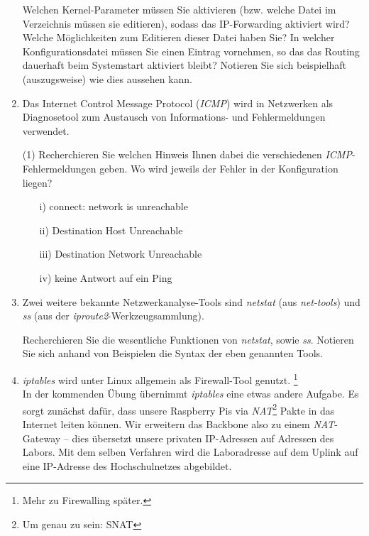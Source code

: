 \documentclass[paper=a4,fontsize=11pt]{scrartcl}%
\numberwithin{equation}{section}
\begin{document}
\begin{enumerate}
\begin{tasks}
	\task Welchen Kernel-Parameter müssen Sie aktivieren (bzw. welche Datei im  Verzeichnis müssen sie editieren), sodass das IP-Forwarding aktiviert wird? Welche Möglichkeiten zum Editieren dieser Datei haben Sie?
	\task In welcher Konfigurationsdatei müssen Sie einen Eintrag vornehmen, so das das Routing dauerhaft beim Systemstart aktiviert bleibt? Notieren Sie sich beispielhaft (auszugsweise) wie dies aussehen kann.
	\end{tasks}
	\item Das Internet Control Message Protocol (\emph{ICMP}) wird in Netzwerken als Diagnosetool zum Austausch von Informations- und Fehlermeldungen verwendet. 
	\begin{tasks}(1)
		\task Recherchieren Sie welchen Hinweis Ihnen dabei die verschiedenen \emph{ICMP}-Fehlermeldungen geben. Wo wird jeweils der Fehler in der Konfiguration liegen?
		\begin{itemize}
			\item[i)] connect: network is unreachable
			\item[ii)] Destination Host Unreachable
			\item[iii)] Destination Network Unreachable
			\item[iv)] keine Antwort auf ein Ping
		\end{itemize}  
	\end{tasks}
	\item Zwei weitere bekannte Netzwerkanalyse-Tools sind \emph{netstat} (aus \emph{net-tools}) und \emph{ss} (aus der \emph{iproute2}-Werkzeugsammlung).
	\begin{tasks}
		\task Recherchieren Sie die wesentliche Funktionen von \emph{netstat}, sowie \emph{ss}.
		\task Notieren Sie sich anhand von Beispielen die Syntax der eben genannten Tools. 
	\end{tasks}
	\item \emph{iptables} wird unter Linux allgemein als Firewall-Tool genutzt. \footnote{Mehr zu Firewalling später.}\\
	In der kommenden Übung übernimmt \emph{iptables} eine etwas andere Aufgabe. Es sorgt zunächst dafür, dass unsere Raspberry Pis via \emph{NAT}\footnote{Um genau zu sein: SNAT} Pakte in das Internet leiten können. Wir erweitern das Backbone also zu einem \emph{NAT}-Gateway -- dies übersetzt unsere privaten IP-Adressen auf Adressen des Labors. Mit dem selben Verfahren wird die Laboradresse auf dem Uplink auf eine IP-Adresse des Hochschulnetzes abgebildet. 
	\begin{tasks}

\end{tasks}
\end{enumerate}
\end{document}

